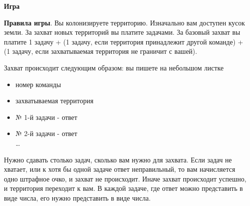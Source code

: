 \documentclass[12pt]{article}
\begin{document}
\centerline{\Large \bf Игра}
{\bf Правила игры}. Вы колонизируете территорию. Изначально вам доступен кусок земли. За захват
новых территорий вы платите задачами. За базовый захват вы платите 1 задачу + (1 задачу, если
территория принадлежит другой команде) + (1 задачу, если захватываемая территория не граничит с
вашей).

Захват происходит следующим образом: вы пишете на небольшом листке
\begin{itemize}
\item номер команды
\item захватываемая территория
\item № 1-й задачи - ответ
\item № 2-й задачи - ответ
\\
\ldots
\end{itemize}
Нужно сдавать столько задач, сколько вам нужно для захвата. Если задач не хватает, или к хотя бы одной
задаче ответ неправильный, то вам начисляется одно штрафное очко, и захват не происходит. Иначе
захват происходит успешно, и территория переходит к вам. В каждой задаче, где ответ можно
представить в виде числа, его нужно представить в виде числа.
\end{document}
